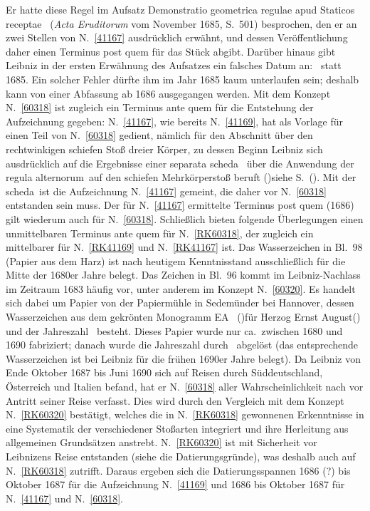 \begin{ledgroup}
%
Er hatte diese Regel im Aufsatz \cite{01098}\glqq Demonstratio geometrica regulae apud Staticos receptae\grqq\
%
(\cite{01023}\textit{Acta Eruditorum} vom November 1685, S.~501) besprochen, 
%
den er an zwei Stellen von N.~\ref{41167} ausdrücklich erwähnt, und dessen Veröffentlichung daher einen Terminus post quem
%
für das Stück abgibt. 
%
Darüber hinaus gibt Leibniz in der ersten Erwähnung des Aufsatzes ein falsches Datum an: \grqq\ statt 1685. 
%
Ein solcher Fehler dürfte ihm im Jahr 1685 kaum unterlaufen sein; deshalb kann von einer Abfassung ab 1686 ausgegangen werden.
%
Mit dem Konzept N.~\ref{60318} ist zugleich ein Terminus ante quem für die Entstehung der Aufzeichnung gegeben:
%
N.~\ref{41167}, wie bereits N.~\ref{41169}, hat als Vorlage für einen Teil von N.~\ref{60318} gedient, 
%
nämlich für den Abschnitt über den rechtwinkigen schiefen Stoß dreier Körper, 
%
zu dessen Beginn Leibniz sich ausdrücklich auf die Ergebnisse einer \glqq separata scheda\grqq\
%
über die Anwendung der \glqq regula alternorum\grqq\ auf den schiefen Mehrkörperstoß beruft (\protect\vphantom)siehe S.~\protect\vphantom().
% 
Mit der \glqq scheda\grqq\ ist die Aufzeichnung N.~\ref{41167} gemeint, die daher vor N.~\ref{60318} entstanden sein muss.
%
Der für N.~\ref{41167} ermittelte Terminus post quem (1686) gilt wiederum auch für N.~\ref{60318}.
%
\pend
%
\pstart
Schließlich bieten folgende Überlegungen  einen unmittelbaren Terminus ante quem für N.~\ref{RK60318},
%
der zugleich ein mittelbarer für N.~\ref{RK41169} und N.~\ref{RK41167} ist.
%
Das Wasserzeichen in Bl.~98 (Papier aus dem Harz) ist nach heutigem Kenntnisstand ausschließlich für die Mitte der 1680er Jahre belegt.
%
Das Zeichen in Bl.~96 kommt im Leibniz-Nachlass im Zeitraum 1683\textendash1687 häufig vor, unter anderem im Konzept N.~\ref{60320}. 
%
Es handelt sich dabei um Papier von der Papiermühle in Sedemünder bei Hannover, 
%
dessen Wasserzeichen aus dem gekrönten Monogramm \glqq EA\grqq\ 
%
(\protect\vphantom)für \protect{}Herzog Ernst August\protect\vphantom()
%
und der Jahreszahl \grqq\ besteht.
%
Dieses Papier wurde nur ca.\ zwischen 1680 und 1690 fabriziert; danach wurde die Jahreszahl durch \grqq\ abgelöst 
%
(das entsprechende Wasserzeichen ist bei Leibniz für die frühen 1690er Jahre belegt).
%
Da Leibniz von Ende Oktober 1687 bis Juni 1690 sich auf Reisen durch Süddeutschland, Österreich und Italien befand, 
%
hat er N.~\ref{60318} aller Wahrscheinlichkeit nach vor Antritt seiner Reise verfasst.
%
Dies wird durch den Vergleich mit dem Konzept N.~\ref{RK60320} bestätigt, welches
%
die in N.~\ref{RK60318} gewonnenen Erkenntnisse in eine Systematik der verschiedener Stoßarten integriert 
%
und ihre Herleitung aus allgemeinen Grundsätzen anstrebt.
%
N.~\ref{RK60320} ist mit Sicherheit vor Leibnizens Reise entstanden (siehe die Datierungsgründe),
%
was deshalb auch auf N.~\ref{RK60318} zutrifft.
%
\pend
%
\pstart
Daraus ergeben sich die Datierungsspannen
%
1686 (?) bis Oktober 1687 für die Aufzeichnung N.~\ref{41169}
%
und 1686 bis Oktober 1687 für N.~\ref{41167} und N.~\ref{60318}.
%
\pend
\end{ledgroup}
%
